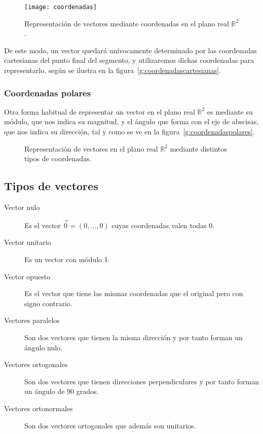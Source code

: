 \documentclass[a4paper]{article}
\begin{document}
\begin{figure}[h!]
\begin{center}
\texttt{[image: coordenadas]}
\caption{Representación de vectores mediante coordenadas en el plano real $\mathbb{R}^2$.}
\label{g:coordenadas}
\end{center}
\end{figure}

De este modo, un vector quedará unívocamente determinado por las coordenadas cartesianas del punto final del segmento, y utilizaremos dichas coordenadas para representarlo, según se ilustra en la figura~\ref{g:coordenadascartesianas}. 

\subsubsection*{Coordenadas polares}
Otra forma habitual de representar un vector en el plano real $\mathbb{R}^2$ es mediante su módulo, que nos indica su magnitud, y el ángulo que forma con el eje de abscisas, que nos indica su dirección, tal y como se ve en la figura~\ref{g:coordenadaspolares}.

\begin{figure}[h!]
\centering {}\qquad
{}
\caption{Representación de vectores en el plano real $\mathbb{R}^2$ mediante distintos tipos de coordenadas.}
\end{figure}  

\subsection*{Tipos de vectores}
\begin{description}
\item [Vector nulo] Es el vector $\vec{0}=(0,\ldots,0)$ cuyas coordenadas valen
todas 0.
\item [Vector unitario] Es un vector con módulo 1.
\item [Vector opuesto] Es el vector que tiene las mismas coordenadas que el original pero con signo contrario.
\item [Vectores paralelos] Son dos vectores que tienen la misma dirección y por
tanto forman un ángulo nulo.
\item [Vectores ortogonales] Son dos vectores que tienen direcciones
perpendiculares y por tanto forman un ángulo de 90 grados.
\item [Vectores ortonormales] Son dos vectores ortogonales que además son
unitarios.
\end{description}
\end{document}
